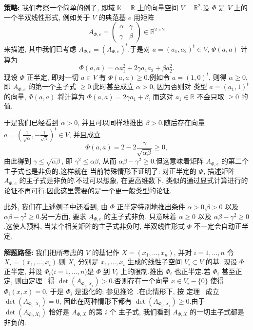 \noindent\textbf{策略:} 我们考察一个简单的例子, 即域 $\mathbb{K} = \mathbb{R}$ 上的向量空间
$V = \mathbb{R}^2$.设 $\varPhi$ 是 $V$ 上的一个半双线性形式, 例如关于 $V$ 的典范基 $e$ 用矩阵
\[
A_{\varPhi, e} = \begin{pmatrix} \alpha & \gamma \\ \gamma & \beta \end{pmatrix} \in \mathbb{R}^{2 \times 2}
\]
来描述, 其中我们已考虑 $A_{\varPhi, e} = (A_{\varPhi, e})^t$.于是对 $a = (a_1, a_2)^t \in V$,
$\varPhi(a, a)$ 计算为
\[
\varPhi(a, a) = \alpha a_1^2 + 2 \gamma a_1 a_2 + \beta a_2^2\text{.}
\]
现设 $\varPhi$ 正半定, 即对一切 $a \in V$ 有 $\varPhi(a, a) \geq 0$.例如令 $a = (1, 0)^t$, 则得
$\alpha \geq 0$, 即 $A_{\varPhi, e}$ 的第一个主子式 $\geq 0$.此时甚至成立 $\alpha > 0$, 因为否则对
类型 $a = (a_1, 1)^t$ 的向量, $\varPhi(a, a)$ 将计算为 $\varPhi(a, a) = 2 \gamma a_1 + \beta$, 而这对
$a_1 \in \mathbb{R}$ 不会只取 $\geq 0$ 的值.

于是我们已经看到 $\alpha > 0$, 并且可以同样地推出 $\beta > 0$.随后存在向量
$a = \left( \frac{1}{\sqrt{\alpha}}, -\frac{1}{\sqrt{\beta}} \right)^t \in V$, 并且成立
\[
\varPhi(a, a) = 2 - 2 \frac{\gamma}{\sqrt{\alpha \beta}} \geq 0,
\]
由此得到 $\gamma \leq \sqrt{\alpha \beta}$, 即 $\gamma^2 \leq \alpha \beta$, 从而
$\alpha \beta - \gamma^2 \geq 0$.但这意味着矩阵 $A_{\varPhi, e}$ 的第二个主子式也是非负的.这样就在
当前特殊情形下证明了: 对正半定的 $\varPhi$, 描述矩阵 $A_{\varPhi, e}$ 的主子式是非负的.不过可以想象,
在更高维数下, 类似的通过显式计算进行的论证不再可行.因此这里需要的是一个更一般类型的论证.

此外, 我们在上述例子中还看到, 由 $\varPhi$ 正半定特别地推出条件 $\alpha > 0$,$\beta > 0$ 以及
$\alpha \beta - \gamma^2 \geq 0$.另一方面, 要求 $A_{\varPhi, e}$ 的主子式非负, 只意味着 $\alpha \geq 0$
以及 $\alpha \beta - \gamma^2 \geq 0$.这使人预料, 当某个相关矩阵的主子式非负时, 半双线性形式
$\varPhi$ 不一定会自动正半定.

\noindent\textbf{解题路径:} 我们把所考虑的 $V$ 的基记作 $X = (x_1, \ldots, x_n)$, 并对 $i = 1, \ldots, n$
令 $X_i = (x_1, \ldots, x_i)$.则 $X_i$ 分别是 $x_1, \ldots, x_i$ 生成的线性子空间 $V_i \subset V$ 的基.
现设 $\varPhi$ 正半定, 并设 $\varPhi_i$($i = 1, \ldots, n$)是 $\varPhi$ 到 $V_i$ 上的限制.推出
$\varPhi_i$ 也正半定.若 $\varPhi_i$ 甚至正定, 则由定理~ 得
$\det(A_{\varPhi_i, X_i}) > 0$.否则存在一个向量 $x \in V_i - \{0\}$ 使得
$\varPhi_i(x, x) = 0$, 于是 $\varPhi_i$ 是退化的; 参见推论~.在此情形下, 按
定理~ 成立 $\det(A_{\varPhi_i, X_i}) = 0$, 因此在两种情形下都有
$\det(A_{\varPhi_i, X_i}) \geq 0$.由于 $\det(A_{\varPhi_i, X_i})$ 恰好是 $A_{\varPhi, X}$ 的第 $i$ 个
主子式, 我们看到 $A_{\varPhi, X}$ 的一切主子式都是非负的.

